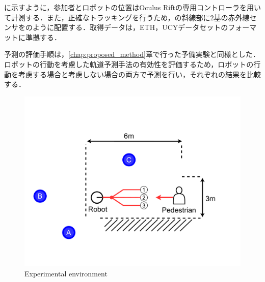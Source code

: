に示すように，参加者とロボットの位置はOculus Riftの専用コントローラを用いて計測する．また，正確なトラッキングを行うため，の斜線部に2基の赤外線センサをのように配置する．取得データは，ETH\cite{pellegrini2009you-eth}，UCY\cite{lerner2007crowds-ucy}データセットのフォーマットに準拠する．

予測の評価手順は，\ref{chap:proposed_method}章で行った予備実験と同様とした．ロボットの行動を考慮した軌道予測手法の有効性を評価するため，ロボットの行動を考慮する場合と考慮しない場合の両方で予測を行い，それぞれの結果を比較する．

\begin{figure}[H]
  \centering
 \includegraphics[keepaspectratio, scale=0.27]
      {images/oculus_experiments.pdf}
\caption{Experimental environment}
 \label{Fig:oculus-exp-overview}
\end{figure} 

